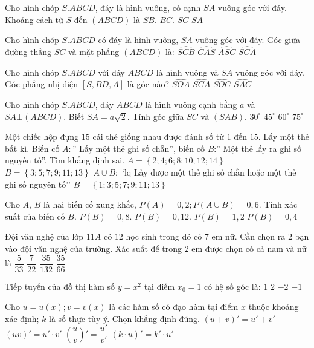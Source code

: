 \begin{ex}
Cho hình chóp $S.ABCD$, đáy là hình vuông, có cạnh $SA$ vuông góc với đáy. Khoảng cách từ $S$ đến $(ABCD)$ là
\choice
{$SB$.}
{$BC$.}
{$SC$}
{$SA$}
\end{ex}
\begin{ex}
Cho hình chóp $S.ABCD$ có đáy là hình vuông, $SA$ vuông góc với đáy. Góc giữa đường thẳng $SC$ và mặt phẳng $(ABCD)$ là:
\choice
{$\widehat{SCB}$}
{$\widehat{CAS}$}
{$\widehat{ASC}$}
{$\widehat{SCA}$}
\end{ex}
\begin{ex}
Cho hình chóp $S.ABCD$ với đáy $ABCD$ là hình vuông và $SA$ vuông góc với đáy. Góc phẳng nhị diện $\left[S, BD, A\right]$ là góc nào?
\choice
{$\widehat{SOA}$}
{$\widehat{SCA}$}
{$\widehat{SOC}$}
{$\widehat{SAC}$}
\end{ex}
\begin{ex}
Cho hình chóp $S.ABCD$, đáy $ABCD$ là hình vuông cạnh bằng $a$ và $SA\bot (ABCD)$. Biết $SA=a\sqrt{2}$. Tính góc giữa $SC$ và $(SAB)$.
\choice
{$30^\circ $}
{$45^\circ $}
{$60^\circ $}
{$75^\circ $}
\end{ex}
\begin{ex}
Một chiếc hộp đựng $15$ cái thẻ giống nhau được đánh số từ $1$ đến $15$. Lấy một thẻ bất kì. Biến cố $A\colon $” Lấy một thẻ ghi số chẵn”, biến cố $B$:” Một thẻ lấy ra ghi số nguyên tố”. Tìm khẳng định sai.
\choice
{$A=\left\{ 2;4;6;8;10;12;14 \right\}$}
{$B=\left\{ 3;5;7;9;11;13 \right\}$}
{$A\cup B\colon$ \lq lq Lấy được một thẻ ghi số chẵn hoặc một thẻ ghi số nguyên tố\rq\rq}
{$B=\left\{ 1;3;5;7;9;11;13 \right\}$}
\end{ex}
\begin{ex}
Cho $A$, $B$ là hai biến cố xung khắc, $P(A)=0{,}2;P\left(A\cup B\right)=0{,}6$. Tính xác suất của biến cố $B$.
\choice
{$P(B)=0{,}8$.}
{$P(B)=0{,}12$.}
{$P(B)=1{,}2$}
{$P(B)=0{,}4$}
\end{ex}
\begin{ex}
Đội văn nghệ của lớp 11$A$ có $12$ học sinh trong đó có $7$ em nữ. Cần chọn ra $2$ bạn vào đội văn nghệ của trường. Xác suất để trong $2$ em được chọn có cả nam và nữ là
\choice
{$\dfrac{5}{33}$}
{$\dfrac{7}{22}$}
{$\dfrac{35}{132}$}
{$\dfrac{35}{66}$}
\end{ex}
\begin{ex}
Tiếp tuyến của đồ thị hàm số $y=x^2$ tại điểm $x_0=1$ có hệ số góc là:
\choice
{$1$}
{$2$}
{$-2$}
{$-1$}
\end{ex}
\begin{ex}
Cho $u=u(x);v=v(x)$ là các hàm số có đạo hàm tại điểm $x$ thuộc khoảng xác định; $k$ là số thực tùy ý. Chọn khẳng định đúng.
\choice
{$(u+v)'=u'+v'$}
{$(uv)'=u' \cdot v'$}
{$\left(\dfrac{u}{v}\right)'=\dfrac{u'}{v'}$}
{$\left(k \cdot u\right)'=k' \cdot u'$}
\end{ex}
